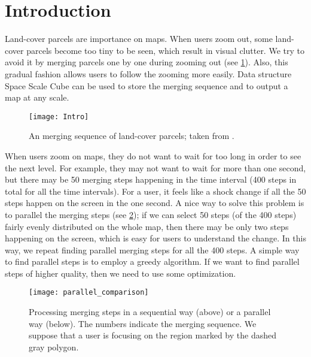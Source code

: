 \documentclass[ijgi,article,submit,moreauthors,pdftex]{Definitions/mdpi}
\begin{document}



\section{Introduction}

Land-cover parcels are importance on maps. 
When users zoom out,
some land-cover parcels become too tiny to be seen,
which result in visual clutter.
We try to avoid it
by merging parcels one by one during zooming out
(see \fig\ref{fig:aggregation_sequence}).
Also, this gradual fashion allows users 
to follow the zooming more easily.
Data structure Space Scale Cube \citep{vanOosterom2014tGAPSSC} 
can be used to store the merging sequence and 
to output a map at any scale.

\begin{figure}[tb]
\centering
\texttt{[image: Intro]}
\caption{An merging sequence of land-cover parcels; 
taken from \citet[][]{Peng2019Thesis}.}
\label{fig:aggregation_sequence}
\end{figure}

When users zoom on maps, 
they do not want to wait for too long 
in order to see the next level.
For example, they may not want to wait for more than one second,
but there may be 50 merging steps happening in the time interval
(400 steps in total for all the time intervals).
For a user, it feels like a shock change 
if all the 50 steps happen on the screen in the one second.
A nice way to solve this problem is to parallel the merging steps
(see \fig\ref{fig:parallel_comparison});
if we can select 50 steps (of the 400 steps) 
fairly evenly distributed on the whole map, 
then there may be only two steps happening on the screen,
which is easy for users to understand the change.
In this way, we repeat finding parallel merging steps 
for all the 400 steps.
A simple way to find parallel steps is to employ a greedy algorithm.
If we want to find parallel steps of higher quality, 
then we need to use some optimization.

\begin{figure}[tb]
\centering
\texttt{[image: parallel\_comparison]}
\caption{Processing merging steps in a sequential way (above) or a parallel way (below). 
The numbers indicate the merging sequence.
We suppose that a user is focusing on the region marked by the dashed gray polygon.}
\label{fig:parallel_comparison}
\end{figure}
\end{document}
